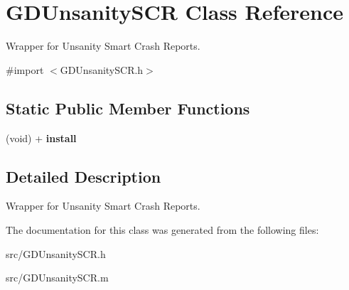 \hypertarget{interface_g_d_unsanity_s_c_r}{
\section{GDUnsanitySCR Class Reference}
\label{interface_g_d_unsanity_s_c_r}
}


Wrapper for Unsanity Smart Crash Reports.  


{\ttfamily \#import $<$GDUnsanitySCR.h$>$}\subsection*{Static Public Member Functions}
\begin{DoxyCompactItemize}
\item 
\hypertarget{interface_g_d_unsanity_s_c_r_ac7e3b597a21d619705b0cddbac55e7ff}{
(void) + {\bfseries install}}
\label{interface_g_d_unsanity_s_c_r_ac7e3b597a21d619705b0cddbac55e7ff}

\end{DoxyCompactItemize}


\subsection{Detailed Description}
Wrapper for Unsanity Smart Crash Reports. 

The documentation for this class was generated from the following files:\begin{DoxyCompactItemize}
\item 
src/GDUnsanitySCR.h\item 
src/GDUnsanitySCR.m\end{DoxyCompactItemize}
